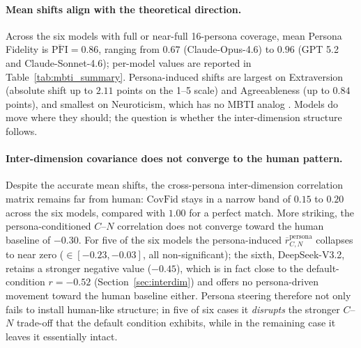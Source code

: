 \documentclass[11pt]{article}
\begin{document}
\paragraph{Mean shifts align with the theoretical direction.}
Across the six models with full or near-full 16-persona coverage, mean Persona Fidelity is $\overline{\mathrm{PFI}} = 0.86$, ranging from $0.67$ (Claude-Opus-4.6) to $0.96$ (GPT 5.2 and Claude-Sonnet-4.6); per-model values are reported in Table~\ref{tab:mbti_summary}.
Persona-induced shifts are largest on Extraversion (absolute shift up to $2.11$ points on the 1--5 scale) and Agreeableness (up to $0.84$ points), and smallest on Neuroticism, which has no MBTI analog \citep{mccrae1992five}.
Models do move where they should; the question is whether the inter-dimension structure follows.

\paragraph{Inter-dimension covariance does not converge to the human pattern.}
Despite the accurate mean shifts, the cross-persona inter-dimension correlation matrix remains far from human: $\mathrm{CovFid}$ stays in a narrow band of $0.15$ to $0.20$ across the six models, compared with $1.00$ for a perfect match.
More striking, the persona-conditioned $C$--$N$ correlation does not converge toward the human baseline of $-0.30$.
For five of the six models the persona-induced $\overline{r}_{C, N}^{\mathrm{persona}}$ collapses to near zero ($\in [-0.23, -0.03]$, all non-significant); the sixth, DeepSeek-V3.2, retains a stronger negative value ($-0.45$), which is in fact close to the default-condition $r = -0.52$ (Section~\ref{sec:interdim}) and offers no persona-driven movement toward the human baseline either.
Persona steering therefore not only fails to install human-like structure; in five of six cases it \emph{disrupts} the stronger $C$--$N$ trade-off that the default condition exhibits, while in the remaining case it leaves it essentially intact.
\end{document}
